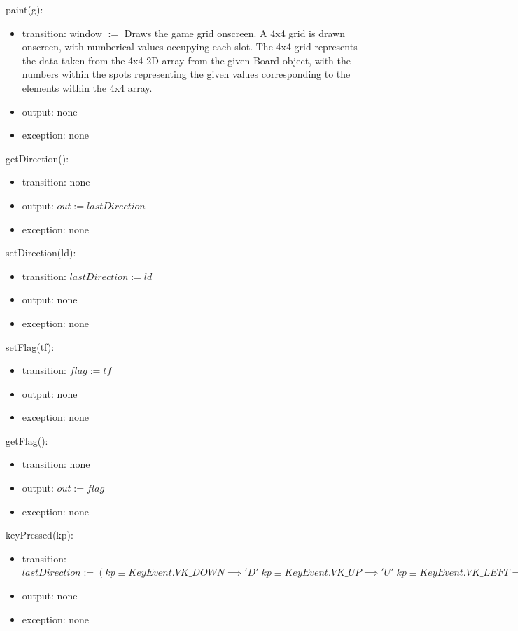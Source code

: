 \documentclass[12pt]{article}
\begin{document}
\noindent paint(g):
\begin{itemize}
\item transition: window $:=$ Draws the game grid onscreen. A 4x4 grid is drawn onscreen, with numberical values occupying each slot. The 4x4 grid represents the data taken from the 4x4 2D array from the given Board object, with the numbers within the spots representing the given values corresponding to the elements within the 4x4 array. 
\item output: none
\item exception: none
\end{itemize}

\noindent getDirection():
\begin{itemize}
\item transition: none
\item output: $out := lastDirection$
\item exception: none
\end{itemize}

\noindent setDirection(ld):
\begin{itemize}
\item transition: $lastDirection := ld$
\item output: none
\item exception: none
\end{itemize}

\noindent setFlag(tf):
\begin{itemize}
\item transition: $flag := tf$
\item output: none
\item exception: none
\end{itemize}

\noindent getFlag():
\begin{itemize}
\item transition: none
\item output: $out := flag$
\item exception: none
\end{itemize}

\noindent keyPressed(kp):
\begin{itemize}
\item transition: $lastDirection := (kp \equiv KeyEvent.VK\_DOWN \implies 'D' |kp \equiv KeyEvent.VK\_UP \implies 'U' | kp \equiv KeyEvent.VK\_LEFT \implies 'L' |kp \equiv KeyEvent.VK\_RIGHT \implies 'R'| kp \equiv KeyEvent.VK\_ESCAPE \implies 'E')$ \\
\item output: none
\item exception: none
\end{itemize}
\end{document}
